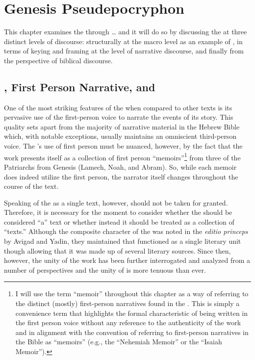 
\chapter{Genesis Pseudepocryphon}

 This chapter examines the \ga through \ldots{} and it will do so by discussing the \ga at three distinct levels of discourse: structurally at the macro level as an example of \psy, in terms of keying and framing at the level of narrative discourse, and finally from the perspective of biblical discourse.

 \section{\GA, First Person Narrative, and \Psy}

 One of the most striking features of the \ga when compared to other \rwb texts is its pervasive use of the first-person voice to narrate the events of its story. This quality sets \ga apart from the majority of narrative material in the Hebrew Bible which, with notable exceptions, usually maintains an omniscient third-person voice. The \ga's use of first person must be nuanced, however, by the fact that the work presents itself as a collection of first person ``memoirs''\footnote{I will use the term ``memoir'' throughout this chapter as a way of referring to the distinct (mostly) first-person narratives found in the \ga. This is simply a convenience term that highlights the formal characteristic of being written in the first person voice without any reference to the authenticity of the work and in alignment with the convention of referring to first-person narratives in the Bible as ``memoirs'' (e.g., the ``Nehemiah Memoir'' or the ``Isaiah Memoir'').} from three of the Patriarchs from Genesis (Lamech, Noah, and Abram). So, while each memoir does indeed utilize the first person, the narrator itself changes throughout the course of the text.
 
Speaking of the \ga as a single text, however, should not be taken for granted. Therefore, it is necessary for the moment to consider whether the \ga should be considered ``a'' text or whether instead it should be treated as a collection of ``texts.''  Although the composite character of the \ga was noted in the \emph{editio princeps} by Avigad and Yadin, they maintained that \ga functioned as a single literary unit though allowing that it was made up of several literary sources.\autocite[38]{avigad_yadin1956} Since then, however, the unity of the work has been further interrogated and analyzed from a number of perspectives and the unity of \ga is more tenuous than ever.

